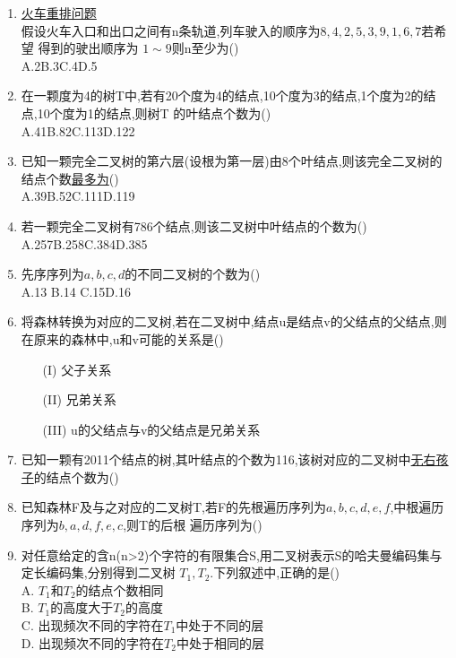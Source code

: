 \documentclass[12pt, a4paper, oneside, UTF8]{ctexbook}
\begin{document}
\begin{enumerate}
    \item \underline{火车重排问题}\\
    假设火车入口和出口之间有n条轨道,列车驶入的顺序为\underline{$8,4,2,5,3,9,1,6,7$}若希望
    得到的驶出顺序为 \underline{$1\sim 9$}则n至少为()\\
    A.2\qquad\qquad B.3\qquad\qquad C.4\qquad\qquad D.5

    \item 在一颗度为4的树T中,若有20个度为4的结点,10个度为3的结点,1个度为2的结点,10个度为1的结点,则树T
    的叶结点个数为() \\
    A.41\qquad\qquad B.82\qquad\qquad C.113\qquad\qquad D.122

    \item 已知一颗完全二叉树的第六层(设根为第一层)由8个叶结点,则该完全二叉树的结点个数\underline{最多为}() \\
    A.39\qquad\qquad B.52\qquad\qquad C.111\qquad\qquad D.119
    
    \item 若一颗完全二叉树有786个结点,则该二叉树中叶结点的个数为() \\
    A.257\qquad\qquad B.258\qquad\qquad C.384\qquad\qquad D.385

    \item 先序序列为\underline{$a,b,c,d$}的不同二叉树的个数为() \\
    A.13 \qquad\qquad B.14 \qquad\qquad C.15\qquad\qquad D.16

    \item 将森林转换为对应的二叉树,若在二叉树中,结点u是结点v的父结点的父结点,则在原来的森林中,u和v可能的关系是()
    \begin{enumerate}
        \item [(I)] 父子关系
        \item [(II)] 兄弟关系
        \item [(III)] u的父结点与v的父结点是兄弟关系
    \end{enumerate}

    \item 已知一颗有2011个结点的树,其叶结点的个数为116,该树对应的二叉树中\underline{无右孩子}的结点个数为()
    
    \item 已知森林F及与之对应的二叉树T,若F的先根遍历序列为\underline{$a,b,c,d,e,f$},中根遍历序列为\underline{$b,a,d,f,e,c$},则T的后根
    遍历序列为()

    \item 对任意给定的含n(n>2)个字符的有限集合S,用二叉树表示S的哈夫曼编码集与定长编码集,分别得到二叉树
    $T_1,T_2$.下列叙述中,正确的是() \\
    A. $T_1$和$T_2$的结点个数相同 \\
    B. $T_1$的高度大于$T_2$的高度 \\
    C. 出现频次不同的字符在$T_1$中处于不同的层 \\
    D. 出现频次不同的字符在$T_2$中处于相同的层


\end{enumerate}
\end{document}
